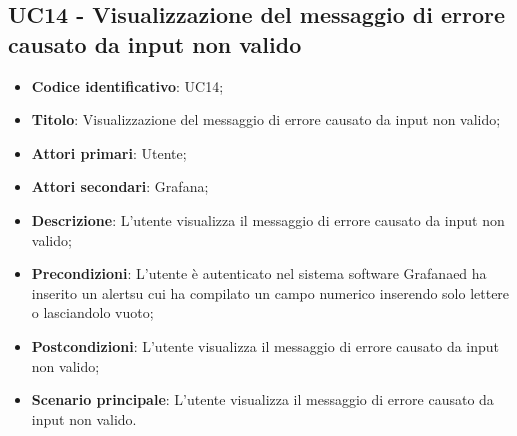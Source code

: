 \subsection{UC14 - Visualizzazione del messaggio di errore causato da input non valido}
\begin{itemize}
	\item \textbf{Codice identificativo}: UC14;
	\item \textbf{Titolo}: Visualizzazione del messaggio di errore causato da input non valido;
	\item \textbf{Attori primari}: Utente;
	\item \textbf{Attori secondari}: Grafana\glo;
	\item \textbf{Descrizione}: L'utente visualizza il messaggio di errore causato da input non valido;
	\item \textbf{Precondizioni}: L'utente è autenticato nel sistema software Grafana\glosp ed ha inserito un alert\glosp su cui ha compilato un campo numerico inserendo solo lettere o lasciandolo vuoto;
	\item \textbf{Postcondizioni}: L'utente visualizza il messaggio di errore causato da input non valido;
	\item \textbf{Scenario principale}: L'utente visualizza il messaggio di errore causato da input non valido.
\end{itemize}